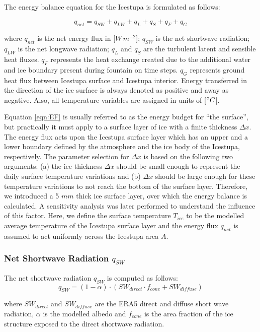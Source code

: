 \documentclass[utf8]{frontiersSCNS} %
\begin{document}
The energy balance equation for the Icestupa is formulated as follows:

\begin{equation} q_{net} = q_{SW} + q_{LW} + q_{L} + q_{S} + q_{F} + q_{G} \label{eqn:EF} \end{equation}

where $q_{net}$ is the net energy flux in [$W\,m^{-2}$]; $q_{SW}$ is the net shortwave radiation; $q_{LW}$ is the net
longwave radiation; $q_{L}$ and $q_{S}$ are the turbulent latent and sensible heat fluxes. $q_{F}$ represents the heat
exchange created due to the additional water and ice boundary present during fountain on time steps. $q_{G}$
represents ground heat flux between Icestupa surface and Icestupa interior. Energy transferred in the direction of the
ice surface is always denoted as positive and away as negative. Also, all temperature variables are assigned in units
of [$\degree C$]. 

Equation \ref{eqn:EF} is usually referred to as the energy budget for “the surface”, but practically it must apply to
a surface layer of ice with a finite thickness $\Delta x$. The energy flux acts upon the Icestupa surface layer which
has an upper and a lower boundary defined by the atmosphere and the ice body of the Icestupa, respectively. The
parameter selection for $\Delta x$ is based on the following two arguments: (a) the ice thickness $\Delta x$ should be
small enough to represent the daily surface temperature variations and (b) $\Delta x$ should be large enough for these
temperature variations to not reach the bottom of the surface layer.  Therefore, we introduced a 5 $mm$ thick ice
surface layer, over which the energy balance is calculated. A sensitivity analysis was later performed to understand
the influence of this factor. Here, we define the surface temperature $T_{ice}$ to be the modelled average temperature
of the Icestupa surface layer and the energy flux $q_{net}$ is assumed to act uniformly across the Icestupa area $A$.

\subsubsection{Net Shortwave Radiation $q_{SW}$} The net shortwave radiation $q_{SW}$ is computed as follows:
\begin{equation} q_{SW} = (1- \alpha)\cdot (SW_{direct} \cdot f_{cone} + SW_{diffuse}) \label{eqn:SW} \end{equation}

where $SW_{direct}$ and $SW_{diffuse}$ are the ERA5 direct and diffuse short wave radiation, $\alpha$ is the modelled
albedo and $f_{cone}$ is the area fraction of the ice structure exposed to the direct shortwave radiation.
\end{document}
